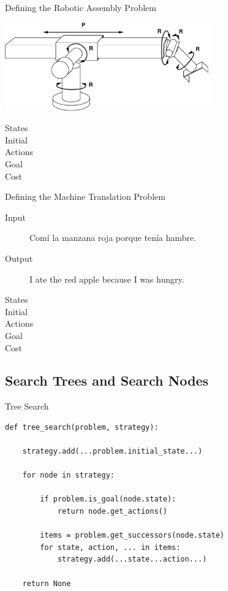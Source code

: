 \documentclass[14pt]{beamer}
\begin{document}
\begin{frame}{Defining the Robotic Assembly Problem}
\begin{center}
\includegraphics[height=1.5in]{stanford-arm.pdf}
\end{center}
\begin{description}
\item[States] 
\item[Initial] 
\item[Actions] 
\item[Goal] 
\item[Cost] 
\end{description}
\end{frame}

\begin{frame}{Defining the Machine Translation Problem}
\begin{description}
\item[Input] Com\'i la manzana roja porque ten\'ia hambre.
\item[Output] I ate the red apple because I was hungry.
\bigskip\bigskip
\item[States]
\item[Initial]
\item[Actions]
\item[Goal]
\item[Cost]
\end{description}
\end{frame}

\subsection{Search Trees and Search Nodes}

\begin{frame}[fragile]{Tree Search}
\footnotesize
\begin{lstlisting}
def tree_search(problem, strategy):

    strategy.add(...problem.initial_state...)

    for node in strategy:

        if problem.is_goal(node.state):
            return node.get_actions()

        items = problem.get_successors(node.state)
        for state, action, ... in items:
            strategy.add(...state...action...)

    return None
\end{lstlisting}
\end{frame}
\end{document}
